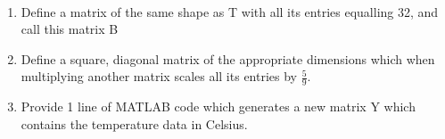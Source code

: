 \
\begin{enumerate}
    \item {Define a matrix of the same shape as T with all its entries equalling 32, and call this matrix B}
    \item {Define a square, diagonal matrix of the appropriate dimensions which when multiplying another matrix scales all its entries by $\frac{5}{9}$.}
    \item {Provide 1 line of MATLAB code which generates a new matrix Y which contains the temperature data in Celsius.}
\end{enumerate}

\begin{solution}\ \\

\end{solution}